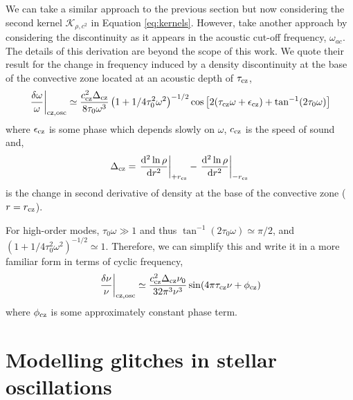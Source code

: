 We can take a similar approach to the previous section but now considering the second kernel \(\mathcal{K}_{\rho,c^2}\) in Equation \ref{eq:kernels}. However, \citet{Houdek.Gough2007} take another approach by considering the discontinuity as it appears in the acoustic cut-off frequency, \(\omega_{ac}\). The details of this derivation are beyond the scope of this work. We quote their result for the change in frequency induced by a density discontinuity at the base of the convective zone located at an acoustic depth of \(\tau_{{\mathrm{cz}}}\),
%
\begin{equation}
    \left.\frac{\delta\omega}{\omega}\right|_{{\mathrm{cz}},\mathrm{osc}} \simeq \frac{c_{{\mathrm{cz}}}^2\Delta_{{\mathrm{cz}}}}{8\tau_0 \omega^3} \left(1 + {1}/{4\tau_0^2\omega^2}\right)^{-1/2} \cos\left[2(\tau_{{\mathrm{cz}}} \omega + \epsilon_{{\mathrm{cz}}}) + \tan^{-1}(2\tau_0\omega)\right]
\end{equation}
%
where \(\epsilon_{{\mathrm{cz}}}\) is some phase which depends slowly on \(\omega\), \(c_{{\mathrm{cz}}}\) is the speed of sound and,
%
\begin{equation}
    \Delta_{{\mathrm{cz}}} = \left.\frac{\mathrm{d}^2 \ln\rho}{\mathrm{d} r^2}\right|_{+r_{{\mathrm{cz}}}} - \left.\frac{\mathrm{d}^2 \ln\rho}{\mathrm{d} r^2}\right|_{-r_{{\mathrm{cz}}}}
\end{equation}
%
is the change in second derivative of density at the base of the convective zone (\(r = r_{{\mathrm{cz}}}\)).

For high-order modes, \(\tau_0 \omega \gg 1\) and thus \(\tan^{-1}(2\tau_0\omega) \simeq \pi/2\), and \((1 + {1}/{4\tau_0^2\omega^2})^{-1/2} \simeq 1\). Therefore, we can simplify this and write it in a more familiar form in terms of cyclic frequency,
%
\begin{equation}
    \left.\frac{\delta\nu}{\nu}\right|_{{\mathrm{cz}},\mathrm{osc}} \simeq \frac{c_{{\mathrm{cz}}}^2\Delta_{{\mathrm{cz}}}\nu_0}{32\pi^3 \nu^3} \sin(4\pi\tau_{{\mathrm{cz}}}\nu + \phi_{{\mathrm{cz}}})
\end{equation}
%
where \(\phi_{{\mathrm{cz}}}\) is some approximately constant phase term.

\section[Modelling the glitch]{Modelling glitches in stellar oscillations}

